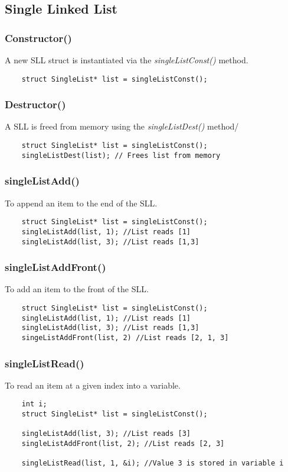 \documentclass{article}
\begin{document}
\newpage
\subsection*{Single Linked List}
\subsubsection*{Constructor()}
A new SLL struct is instantiated via the \emph{singleListConst()} method.
\begin{lstlisting}
    struct SingleList* list = singleListConst();
\end{lstlisting}

\subsubsection*{Destructor()}
A SLL is freed from memory using the \emph{singleListDest()} method/

\begin{lstlisting}
    struct SingleList* list = singleListConst();
    singleListDest(list); // Frees list from memory
\end{lstlisting}

\subsubsection*{singleListAdd()}
To append an item to the end of the SLL.
\begin{lstlisting}
    struct SingleList* list = singleListConst();
    singleListAdd(list, 1); //List reads [1]
    singleListAdd(list, 3); //List reads [1,3]
\end{lstlisting}

\subsubsection*{singleListAddFront()}
To add an item to the front of the SLL.
\begin{lstlisting}
    struct SingleList* list = singleListConst();
    singleListAdd(list, 1); //List reads [1]
    singleListAdd(list, 3); //List reads [1,3]
    singeListAddFront(list, 2) //List reads [2, 1, 3]   
\end{lstlisting}

\subsubsection*{singleListRead()}
To read an item at a given index into a variable.
\begin{lstlisting}
    int i;
    struct SingleList* list = singleListConst();

    singleListAdd(list, 3); //List reads [3]
    singleListAddFront(list, 2); //List reads [2, 3]

    singleListRead(list, 1, &i); //Value 3 is stored in variable i
\end{lstlisting}
\end{document}
